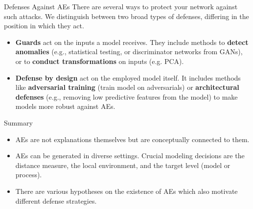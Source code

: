 \documentclass[11pt,compress,t,notes=noshow, xcolor=table]{beamer}
\begin{document}
\begin{vbframe}{Defenses Against AEs}
There are several ways to protect your network against such attacks. We distinguish between two broad types of defenses, differing in the position in which they act.
\begin{itemize}
    \item \textbf{Guards} act on the inputs a model receives. They include methods to \textbf{detect anomalies} (e.g., statistical testing, or discriminator networks from GANs), or to \textbf{conduct transformations} on inputs (e.g. PCA).
    \item \textbf{Defense by design} act on the employed model itself. It includes methods like \textbf{adversarial training} (train model on adversarials) or \textbf{architectural defenses} (e.g., removing low predictive features from the model) %
    to make models more robust against AEs.
\end{itemize}
\end{vbframe}


\begin{vbframe}{Summary}
\begin{itemize}
    \item AEs are not explanations themselves but are conceptually connected to them.
    \item AEs can be generated in diverse settings. Crucial modeling decisions are the distance measure, the local environment, and the target level (model or process).
    \item There are various hypotheses on the existence of AEs which also motivate different defense strategies.
\end{itemize}
\end{vbframe}
\end{document}
